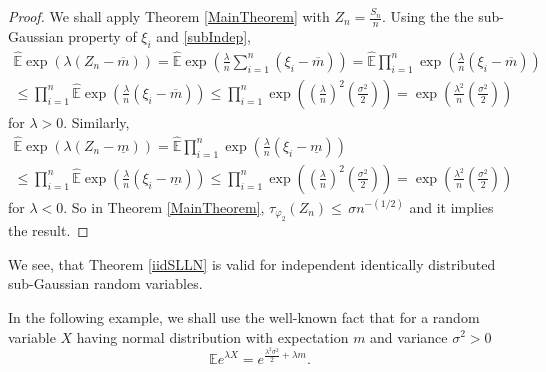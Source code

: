 \documentclass[12pt]{article}
\theoremstyle{definition}
\theoremstyle{remark}
\numberwithin{equation}{section}
\def\E{{\mathbb {E}}}                       \def\D{{\mathbb {D}}}
\def\Eh{{\hat{\mathbb{E}}}}
\begin{document}
\begin{proof}
We shall apply Theorem \ref{MainTheorem} with $Z_n = \frac{S_n}{n}$.
Using the the sub-Gaussian property of $\xi_i$ and \eqref{subIndep},
\begin{eqnarray}
\Eh \exp( \lambda(Z_n - \overline{m}) ) =
\Eh \exp\left( \frac{\lambda}{n} \sum_{i=1}^n (\xi_i- \overline{m}) \right)=
\Eh \prod_{i=1}^n \exp\left( \frac{\lambda}{n}  (\xi_i- \overline{m}) \right)   \nonumber \\
\le
\prod_{i=1}^n \Eh\exp\left( \frac{\lambda}{n}  (\xi_i- \overline{m}) \right)
\le 
\prod_{i=1}^n \exp\left( \left(\frac{\lambda}{n}\right)^2  \left(\frac{\sigma^2}{2}\right) \right)
= \exp\left( \frac{\lambda^2}{n}  \left(\frac{\sigma^2}{2}\right) \right)
\end{eqnarray}
for $\lambda>0$.
Similarly,
\begin{eqnarray}
\Eh \exp( \lambda(Z_n - \underline{m}) ) =
\Eh \prod_{i=1}^n \exp\left( \frac{\lambda}{n}  (\xi_i- \underline{m}) \right)   \nonumber \\
\le
\prod_{i=1}^n \Eh\exp\left( \frac{\lambda}{n}  (\xi_i- \underline{m}) \right)
\le 
\prod_{i=1}^n \exp\left( \left(\frac{\lambda}{n}\right)^2  \left(\frac{\sigma^2}{2}\right) \right)
= \exp\left( \frac{\lambda^2}{n}  \left(\frac{\sigma^2}{2}\right) \right)
\end{eqnarray}
for $\lambda<0$.
So in Theorem \ref{MainTheorem},
$\tau_{\varphi_2}\!( Z_n )\le \,\sigma n^{-(1/2)}$ and it implies the result.
\end{proof}
We see, that Theorem \ref{iidSLLN} is valid for independent identically distributed sub-Gaussian random variables.

In the following example, we shall use the well-known fact that for a random variable $X$ having normal distribution
with expectation $m$ and variance $\sigma^2>0$
$$
\E e^{\lambda X} = e^{\frac{\lambda^2 \sigma^2}{2} + \lambda m} .
$$
\end{document}
